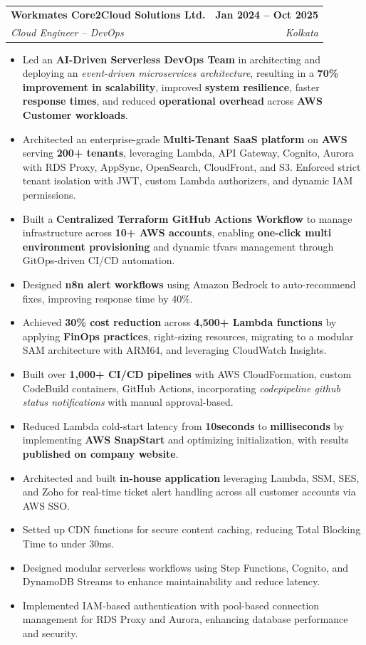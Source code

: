 \documentclass[letterpaper,11pt]{article}
\makeatletter
\newcommand{\resumeItem}[1]{
  \item\small{
    {#1 \vspace{-1pt}}
  }
}
\newcommand{\resumeSubheading}[4]{
  \vspace{-1pt}\item
    \begin{tabular*}{1.0\textwidth}[t]{l@{\extracolsep{\fill}}r}
      \textbf{#1} & \textbf{\small #2} \\
      \textit{\small#3} & \textit{\small #4} \\
    \end{tabular*}\vspace{-5pt}
}
\newcommand{\resumeItemListStart}{\begin{itemize}}
\newcommand{\resumeItemListEnd}{\end{itemize}\vspace{-3pt}}
\makeatother
\begin{document}
    \resumeSubheading
      {Workmates Core2Cloud Solutions Ltd.}{Jan 2024 -- Oct 2025}
      {Cloud Engineer -- DevOps}{Kolkata}
      \resumeItemListStart
        \resumeItem{Led an \textbf{AI-Driven Serverless DevOps Team} in architecting and deploying an \textit{event-driven microservices architecture}, resulting in a \textbf{70\% improvement in scalability}, improved \textbf{system resilience}, faster \textbf{response times}, and reduced \textbf{operational overhead} across \textbf{AWS Customer workloads}.}
        \resumeItem{Architected an enterprise-grade \textbf{Multi-Tenant SaaS platform} on \textbf{AWS} serving \textbf{200+ tenants}, leveraging Lambda, API Gateway, Cognito, Aurora with RDS Proxy, AppSync, OpenSearch, CloudFront, and S3. Enforced strict tenant isolation with JWT, custom Lambda authorizers, and dynamic IAM permissions.}
        \resumeItem{Built a \textbf{Centralized Terraform GitHub Actions Workflow} to manage infrastructure across \textbf{10+ AWS accounts}, enabling \textbf{one-click multi environment provisioning} and dynamic tfvars management through GitOps-driven CI/CD automation.}
        \resumeItem{Designed \textbf{n8n alert workflows} using Amazon Bedrock to auto-recommend fixes, improving response time by 40\%.}
        \resumeItem{Achieved \textbf{30\% cost reduction} across \textbf{4,500+ Lambda functions} by applying \textbf{FinOps practices}, right-sizing resources, migrating to a modular SAM architecture with ARM64, and leveraging CloudWatch Insights.}
        \resumeItem{Built over \textbf{1,000+ CI/CD pipelines} with AWS CloudFormation, custom CodeBuild containers, GitHub Actions, incorporating \textit{codepipeline github status notifications} with manual approval-based.}
        \resumeItem{Reduced Lambda cold-start latency from \textbf{10seconds} to \textbf{milliseconds} by implementing \textbf{AWS SnapStart} and optimizing initialization, with results \textbf{published on company website}.}
        \resumeItem{Architected and built \textbf{in-house application} leveraging Lambda, SSM, SES, and Zoho for real-time ticket alert handling across all customer accounts via AWS SSO.}
        \resumeItem{Setted up CDN functions for secure content caching, reducing Total Blocking Time to under 30ms.}
        \resumeItem{Designed modular serverless workflows using Step Functions, Cognito, and DynamoDB Streams to enhance maintainability and reduce latency.}
        \resumeItem{Implemented IAM-based authentication with pool-based connection management for RDS Proxy and Aurora, enhancing database performance and security.}
      \resumeItemListEnd
\end{document}
